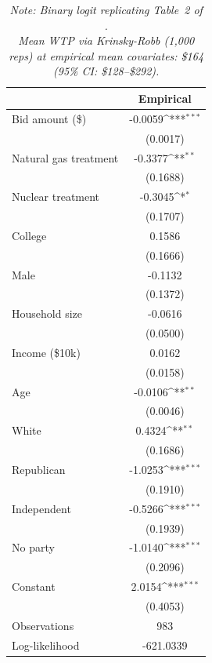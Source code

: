 {
\begin{table}[]
\centering
\caption{Replication of Study 1}
\def\sym#1{\ifmmode^{#1}\else\(^{#1}\)\fi}
\begin{tabular}{l*{1}{c}}
\toprule
                    &\multicolumn{1}{c}{Empirical}\\
\midrule
Bid amount (\$)      &     -0.0059\sym{***}\\
                    &    (0.0017)         \\
\addlinespace
Natural gas treatment&     -0.3377\sym{**} \\
                    &    (0.1688)         \\
\addlinespace
Nuclear treatment   &     -0.3045\sym{*}  \\
                    &    (0.1707)         \\
\addlinespace
College             &      0.1586         \\
                    &    (0.1666)         \\
\addlinespace
Male                &     -0.1132         \\
                    &    (0.1372)         \\
\addlinespace
Household size      &     -0.0616         \\
                    &    (0.0500)         \\
\addlinespace
Income (\$10k)       &      0.0162         \\
                    &    (0.0158)         \\
\addlinespace
Age                 &     -0.0106\sym{**} \\
                    &    (0.0046)         \\
\addlinespace
White               &      0.4324\sym{**} \\
                    &    (0.1686)         \\
\addlinespace
Republican          &     -1.0253\sym{***}\\
                    &    (0.1910)         \\
\addlinespace
Independent         &     -0.5266\sym{***}\\
                    &    (0.1939)         \\
\addlinespace
No party            &     -1.0140\sym{***}\\
                    &    (0.2096)         \\
\addlinespace
Constant            &      2.0154\sym{***}\\
                    &    (0.4053)         \\
\midrule
Observations        &         983         \\
Log-likelihood      &   -621.0339         \\
\bottomrule
\end{tabular}
\caption*{\footnotesize \textit{Note: Binary logit replicating Table~2 of \textcite{Aldy2012}.\\
Mean WTP via Krinsky-Robb (1{,}000 reps) at empirical mean covariates: \$164 (95\% CI: \$128--\$292).}}
\end{table}
}
